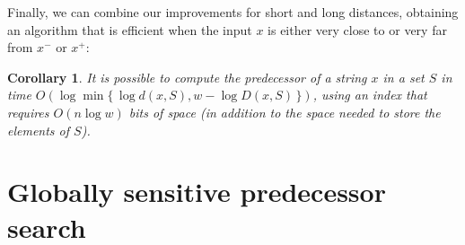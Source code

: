 \documentclass[a4paper,11pt]{article}
\newtheorem{corollary}[theorem]{Corollary}
\newcommand{\?}{\mskip1.5mu}
\def\..{\,\mathpunct{\ldotp\ldotp}} %
\DeclareMathOperator{\lrange}{left}
\DeclareMathOperator{\rrange}{right}
\DeclareMathOperator{\extent}{extent}
\DeclareMathOperator{\fbs}{FBS}
\begin{document}

Finally, we can combine our improvements for short and long distances, obtaining an algorithm that is
efficient when the input $x$ is either very close to or very far from $x^-$ or $x^+$:
\begin{corollary}
It is possible to compute the predecessor of a string $x$ in a set $S$
in time $O(\log \min \{\,\log d(x,S),w-\log D(x,S)\,\})$, using an index that
requires $O(n \log w)$ bits of space (in addition to the space
needed to store the elements of $S$).
\end{corollary}

\section{Globally sensitive predecessor search}
\end{document}
